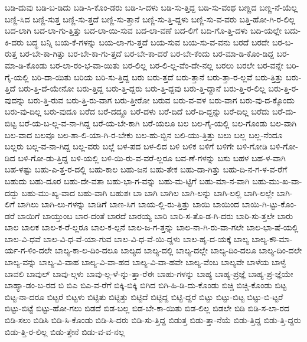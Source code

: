 {ಬಡಿ-ದುವು
ಬಡಿ-ಬ-ಡಿದು
ಬಡಿ-ಸಿ-ಕೊಂ-ಡರು
ಬಡಿ-ಸಿ-ದಳು
ಬಡಿ-ಸು-ತ್ತಿದ್ದ
ಬಡಿ-ಸು-ವಂಥ
ಬಣ್ಣದ
ಬಣ್ಣ-ನೆ-ಯೆಲ್ಲ
ಬಣ್ಣಿ-ಸಿದ
ಬಣ್ಣಿ-ಸುತ್ತ
ಬಣ್ಣಿ-ಸು-ತ್ತದೆ
ಬಣ್ಣಿ-ಸು-ತ್ತಾನೆ
ಬಣ್ಣಿ-ಸು-ತ್ತಿ-ದ್ದಳು
ಬಣ್ಣಿ-ಸು-ವ-ವರು
ಬತ್ತಿ-ಹೋ-ಗಿ-ರ-ಲಿಲ್ಲ
ಬದ-ಲಾಗಿ
ಬದ-ಲಾ-ಗು-ತ್ತಿತ್ತು
ಬದ-ಲಾ-ಯಿ-ಸುವ
ಬದ-ಲಾ-ವಣೆ
ಬದ-ಲಿಗೆ
ಬದಿ-ಗೊ-ತ್ತಿ-ದಳು
ಬದಿ-ಯಲ್ಲೇ
ಬದು-ಕಿ-ದರು
ಬದ್ಧ
ಬನ್ನಿ
ಬಯ-ಕೆ-ಗಳನ್ನು
ಬಯ-ಲಾ-ಗು-ತ್ತದೆ
ಬಯ-ಸುವ
ಬಯ-ಸು-ವ-ವನು
ಬರದೆ
ಬರದೇ
ಬರ-ಬ-ರುತ್ತ
ಬರ-ಬೇ-ಕಾ-ಗಿತ್ತು
ಬರ-ಬೇ-ಕಾ-ಗು-ತ್ತದೆ
ಬರ-ಬೇ-ಕಾ-ದರೆ
ಬರ-ಬೇ-ಕೆಂದು
ಬರ-ಮಾ-ಡಿ-ಕೊಂ-ಡಿದ್ದ
ಬರ-ಮಾ-ಡಿ-ಕೊಂಡು
ಬರ-ಲಾ-ರಂ-ಭ-ವಾ-ಯಿತು
ಬರ-ಲಿಲ್ಲ
ಬರ-ಲಿ-ಲ್ಲ-ವೆಂ-ದೇ-ನಲ್ಲ
ಬರಲು
ಬರಲೇ
ಬರ-ವನ್ನೇ
ಬರಿ-ಗೈ-ಯಲ್ಲಿ
ಬರಿ-ದಾ-ಯಿತು
ಬರಿಯ
ಬರಿ-ಸು-ತ್ತಿದ್ದ
ಬರು
ಬರು-ತ್ತದೆ
ಬರು-ತ್ತಾನೆ
ಬರು-ತ್ತಾ-ರ-ಲ್ಲವೆ
ಬರು-ತ್ತಿತ್ತು
ಬರು-ತ್ತಿದೆ
ಬರು-ತ್ತಿ-ದೆ-ಯೇನೋ
ಬರು-ತ್ತಿದ್ದ
ಬರು-ತ್ತಿ-ದ್ದರು
ಬರು-ತ್ತಿ-ದ್ದವು
ಬರು-ತ್ತಿ-ದ್ದಾನೆ
ಬರು-ತ್ತಿ-ರ-ಲಿಲ್ಲ
ಬರು-ತ್ತಿ-ರ-ವುದನ್ನು
ಬರು-ತ್ತಿ-ರುವ
ಬರು-ತ್ತಿ-ರು-ವಾಗ
ಬರು-ತ್ತೀರೋ
ಬರುವ
ಬರು-ವ-ವಳ
ಬರು-ವಾಗ
ಬರು-ವು-ದ-ಕ್ಕೊಂದು
ಬರು-ವು-ದಿಲ್ಲ
ಬರು-ವುದೂ
ಬರೆದ
ಬರೆ-ದದ್ದೂ
ಬರೆ-ದಳು
ಬರೆ-ದಿದೆ
ಬರೆ-ದಿ-ದ್ದನ್ನು
ಬರೆ-ದಿಲ್ಲ
ಬರೆದು
ಬರೆ-ದು-ಬಿಟ್ಟ
ಬರೆ-ಯ-ಬ-ಲ್ಲ-ವ-ನಾ-ಗಿದ್ದ
ಬರೆ-ಯ-ಬೇ-ಕಾಗಿ
ಬರೆ-ಯಲೂ
ಬಲ
ಬಲ-ಗೈ-ಯಲ್ಲಿ
ಬಲ-ಗೊಂಡು
ಬಲ-ವಾಗಿ
ಬಲ-ವಾದ
ಬಲವೂ
ಬಲ-ಶಾ-ಲಿ-ಯಾ-ಗಿ-ರ-ಬೇಕು
ಬಲ-ಹು-ಬ್ಬಿನ
ಬಲಿ-ಯು-ತ್ತಿತ್ತು
ಬಲು
ಬಲ್ಲ
ಬಲ್ಲ-ನೆಂದೂ
ಬಲ್ಲರು
ಬಲ್ಲ-ವ-ನಾ-ಗಿದ್ದ
ಬಲ್ಲ-ವರು
ಬಲ್ಲೆ
ಬಳ-ಪದ
ಬಳ-ಲಿದ
ಬಳಿ
ಬಳಿಕ
ಬಳಿಗೆ
ಬಳಿಗೇ
ಬಳಿ-ಗೋಡಿ
ಬಳಿ-ಗೋ-ಡಿದ
ಬಳಿ-ಗೋ-ಡು-ತ್ತಿದ್ದ
ಬಳಿ-ಯಲ್ಲಿ
ಬಳಿ-ಯಿ-ರು-ವ-ವರೆ-ಲ್ಲರೂ
ಬವ-ಣೆ-ಗಳನ್ನು
ಬಸು
ಬಹಳ
ಬಹ-ಳ-ವಾಗಿ
ಬಹ-ಳಷ್ಟು
ಬಹು-ಎ-ತ್ತ-ರ-ದಲ್ಲಿ
ಬಹು-ಕಾಲ
ಬಹು-ಜನ
ಬಹು-ತೇಕ
ಬಹು-ದಾ-ಗಿತ್ತು
ಬಹು-ದಿ-ನ-ಗ-ಳ-ವ-ರೆಗೆ
ಬಹುದು
ಬಹು-ದೂರ
ಬಹು-ದೇ-ವತಾ
ಬಹು-ಭಾ-ಗ-ವನ್ನು
ಬಹು-ಮ-ಟ್ಟಿಗೆ
ಬಹು-ಮಾ-ನ-ವಾಗಿ
ಬಹು-ಮು-ಖ-ವಾ-ದದ್ದು
ಬಹು-ಮು-ಖ್ಯ-ವಾದ
ಬಹು-ವಾಗಿ
ಬಹುಶಃ
ಬಾ
ಬಾಗಿ
ಬಾಗಿಲ
ಬಾಗಿ-ಲನ್ನು
ಬಾಗಿ-ಲಲ್ಲಿ
ಬಾಗಿ-ಲಲ್ಲೇ
ಬಾಗಿ-ಲಿಗೆ
ಬಾಗಿಲು
ಬಾಗಿ-ಲು-ಗಳನ್ನು
ಬಾಡಿಗೆ
ಬಾಣ-ಸಿಗ
ಬಾಯ-ಲ್ಲಿ-ರು-ತ್ತಿತ್ತು
ಬಾಯಿ
ಬಾಯಿಂದ
ಬಾಯಿ-ಗಿ-ಟ್ಟು-ಕೊಂ-ಡರೆ
ಬಾಯಿಗೆ
ಬಾಯ್ತುಂಬ
ಬಾರ-ದಂತೆ
ಬಾರದೆ
ಬಾರಯ್ಯ
ಬಾರಿ
ಬಾರಿ-ಸ-ತೊ-ಡ-ಗಿ-ದರು
ಬಾರಿ-ಸು-ತ್ತಲೇ
ಬಾರು
ಬಾಲ
ಬಾಲಕ
ಬಾಲ-ಕ-ರೆ-ಲ್ಲರೂ
ಬಾಲ-ಕ-ಲ್ಪನೆ
ಬಾಲ-ಜ-ಗ-ತ್ತನ್ನು
ಬಾಲ-ನಾ-ಗಿ-ರು-ವಾ-ಗಲೇ
ಬಾಲ-ಭಾ-ಷೆ-ಯಲ್ಲಿ
ಬಾಲ-ವಿ-ಧವೆ
ಬಾಲ-ವಿ-ಧ-ವೆ-ಯಾ-ಗುವ
ಬಾಲ-ವಿ-ಧ-ವೆ-ಯಿ-ದ್ದಳು
ಬಾಲ-ಹೃ-ದ-ಯಕ್ಕೆ
ಬಾಲ್ಯ
ಬಾಲ್ಯ-ಕೌ-ಮಾ-ರ್ಯ-ಗ-ಳಿಂ-ದಲೇ
ಬಾಲ್ಯ-ಕಾ-ಲ-ದಿಂ-ದಲೂ
ಬಾಲ್ಯದ
ಬಾಲ್ಯ-ದಲ್ಲಿ
ಬಾಲ್ಯ-ದಲ್ಲೇ
ಬಾಲ್ಯ-ದಿಂ-ದಲೂ
ಬಾಲ್ಯ-ದಿಂ-ದಲೇ
ಬಾಲ್ಯ-ವನ್ನು
ಬಾಲ್ಯ-ವಿ-ವಾಹ
ಬಾಲ್ಯ-ವಿ-ವಾ-ಹದ
ಬಾಲ್ಯ-ವಿ-ವಾ-ಹವೇ
ಬಾಲ್ಯ-ವೆಂಬ
ಬಾಲ್ಯವೇ
ಬಾಳೆಯ
ಬಾಳ್ವೆ
ಬಾವಲಿ
ಬಾವುಲ್
ಬಾವು-ಲ್ಗಳು
ಬಾವು-ಲ್ಗ-ಳೆ-ನ್ನು-ತ್ತಾ-ರೆಈ
ಬಾಹು-ಗಳನ್ನು
ಬಾಹ್ಯ
ಬಾಹ್ಯ-ಪ್ರಜ್ಞೆ
ಬಾಹ್ಯ-ಪ್ರ-ಜ್ಞೆಯೇ
ಬಾಹ್ಯಾ-ಡಂ-ಬ-ರದ
ಬಿ
ಬಿಎ
ಬಿಎ-ವ-ರೆಗೆ
ಬಿಕ್ಕಿ-ಬಿಕ್ಕಿ
ಬಿಗಿದ
ಬಿಗಿ-ಹಿ-ಡಿ-ದು-ಕೊಂಡು
ಬಿಚ್ಚಿ
ಬಿಚ್ಚಿ-ಕೊಂಡು
ಬಿಟ್ಟ
ಬಿಟ್ಟ-ನಾ-ದರೂ
ಬಿಟ್ಟರೆ
ಬಿಟ್ಟಳು
ಬಿಟ್ಟಿತು
ಬಿಟ್ಟಿತ್ತು
ಬಿಟ್ಟಿದೆ
ಬಿಟ್ಟಿದ್ದ
ಬಿಟ್ಟಿ-ದ್ದರೆ
ಬಿಟ್ಟು
ಬಿಟ್ಟು-ಬಿಟ್ಟ
ಬಿಟ್ಟು-ಬಿ-ಟ್ಟರೆ
ಬಿಟ್ಟು-ಬಿಟ್ಟೆ
ಬಿಟ್ಟು-ಹೋ-ಗಲು
ಬಿಡದೆ
ಬಿಡ-ಬಲ್ಲ
ಬಿಡ-ಬೇ-ಕಾ-ಯಿತು
ಬಿಡ-ಲಿಲ್ಲ
ಬಿಡಲೇ
ಬಿಡಿ
ಬಿಡಿ-ಸ-ಲಾ-ರದ
ಬಿಡಿ-ಸಲು
ಬಿಡಿಸಿ
ಬಿಡಿ-ಸಿ-ಕೊಂಡು
ಬಿಡಿ-ಸಿ-ದರು
ಬಿಡಿ-ಸು-ತ್ತಿದ್ದ
ಬಿಡುತ್ತ
ಬಿಡು-ತ್ತಾ-ನೆಯೆ
ಬಿಡು-ತ್ತಿದ್ದ
ಬಿಡು-ತ್ತಿ-ದ್ದರು
ಬಿಡು-ತ್ತಿ-ರ-ಲಿಲ್ಲ
ಬಿಡು-ತ್ತೇನೆ
ಬಿಡು-ವ-ವ-ನಲ್ಲ
}
